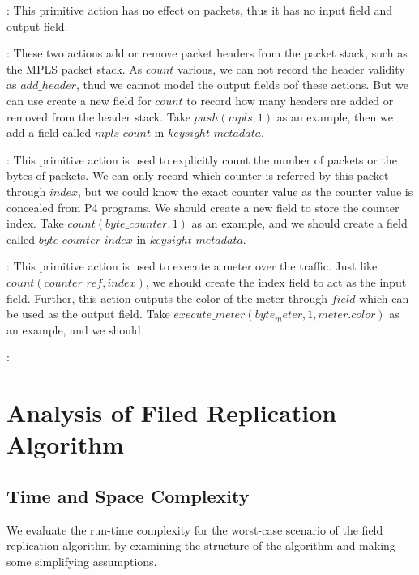 : This primitive action has no effect on packets, thus it has no input field and output field.

: These two actions add or remove packet headers from the packet stack, such as the MPLS packet stack. As $count$ various, we can not record the header validity as $add\_header$, thud we cannot model the output fields oof these actions. But we can use create a new field for $count$ to record how many headers are added or removed from the header stack. Take $push(mpls, 1)$ as an example, then we add a field called $mpls\_count$ in $keysight\_metadata$.

: This primitive action is used to explicitly count the number of packets or the bytes of packets. We can only record which counter is referred by this packet through $index$, but we could know the exact counter value as the counter value is concealed from P4 programs. We should create a new field to store the counter index. Take $count(byte\_counter, 1)$ as an example, and we should create a field called $byte\_counter\_index$ in $keysight\_metadata$.

: This primitive action is used to execute a meter over the traffic. Just like $count (counter\_ref, index)$, we should create the index field to act as the input field. Further, this action outputs the color of the meter through $field$ which can be used as the output field. Take $execute\_meter (byte_meter, 1, meter.color)$ as an example, and we should

: 


\section{Analysis of Filed Replication Algorithm}





\subsection{Time and Space Complexity}
We evaluate the run-time complexity for the worst-case scenario of the field replication algorithm by examining the structure of the algorithm and making some simplifying assumptions.

